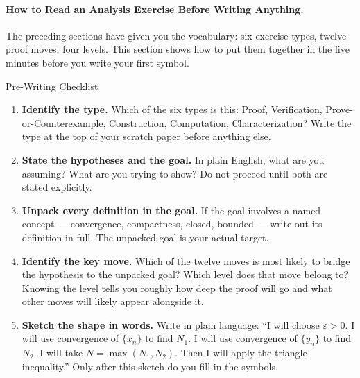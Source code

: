 \paragraph{How to Read an Analysis Exercise Before Writing Anything.}

The preceding sections have given you the vocabulary: six exercise types,
twelve proof moves, four levels. This section shows how to put them
together in the five minutes before you write your first symbol.

\begin{propositionbox}{Pre-Writing Checklist}
\begin{enumerate}[itemsep=4pt]
  \item \textbf{Identify the type.}
    Which of the six types is this: Proof, Verification,
    Prove-or-Counterexample, Construction, Computation, Characterization?
    Write the type at the top of your scratch paper before anything else.

  \item \textbf{State the hypotheses and the goal.}
    In plain English, what are you assuming? What are you trying to show?
    Do not proceed until both are stated explicitly.

  \item \textbf{Unpack every definition in the goal.}
    If the goal involves a named concept --- convergence, compactness,
    closed, bounded --- write out its definition in full.
    The unpacked goal is your actual target.

  \item \textbf{Identify the key move.}
    Which of the twelve moves is most likely to bridge the hypothesis
    to the unpacked goal? Which level does that move belong to?
    Knowing the level tells you roughly how deep the proof will go and
    what other moves will likely appear alongside it.

  \item \textbf{Sketch the shape in words.}
    Write in plain language: ``I will choose $\varepsilon > 0$.
    I will use convergence of $\{x_n\}$ to find $N_1$. I will use
    convergence of $\{y_n\}$ to find $N_2$. I will take
    $N = \max(N_1, N_2)$. Then I will apply the triangle inequality.''
    Only after this sketch do you fill in the symbols.
\end{enumerate}
\end{propositionbox}

